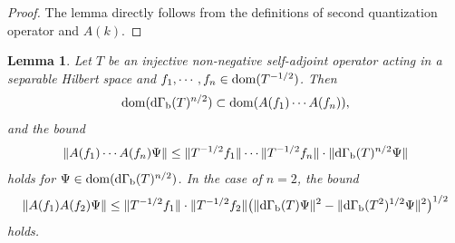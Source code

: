 \documentclass[12pt]{article}
\theoremstyle{plain}
\newtheorem{lem}[theorem]{\bf Lemma}
\numberwithin{equation}{section}
\theoremstyle{remark}
\begin{document}
\begin{proof}
 The lemma directly follows from the definitions of second quantization operator and $A(k)$.
\end{proof}


\begin{lem}{\label{ak3}}
Let $T$ be an injective non-negative self-adjoint operator acting in a separable Hilbert space and $f_1,\cdots,f_n\in \mathop{\mathrm{dom}}(T^{-1/2})$.
Then
\begin{align*}
  \mathop{\mathrm{dom}}(\mathrm{d\Gamma_b}(T)^{n/2})\subset \mathop{\mathrm{dom}}(A(f_1)\cdots A(f_n)),
\end{align*}
and the bound 
\begin{align}
  \| A(f_1)\cdots A(f_n)\Psi \|
 \leq \| T^{-1/2}f_1 \|\cdots \| T^{-1/2}f_n \| \cdot \| \mathrm{d\Gamma_b}(T)^{n/2}\Psi \| \label{ak3-1}
\end{align}
holds for $\Psi\in\mathop{\mathrm{dom}}(\mathrm{d\Gamma_b}(T)^{n/2})$.
In the case of $n=2$, the bound
\begin{align}
  \| A(f_1) A(f_2)\Psi \|
 \leq \| T^{-1/2}f_1 \|\cdot \| T^{-1/2}f_2 \|
  \big( \| \mathrm{d\Gamma_b}(T)\Psi \|^2 - \| \mathrm{d\Gamma_b}(T^2)^{1/2}\Psi \|^2 \big)^{1/2} \label{ak3-2}
\end{align}
holds.
\end{lem}
\end{document}
